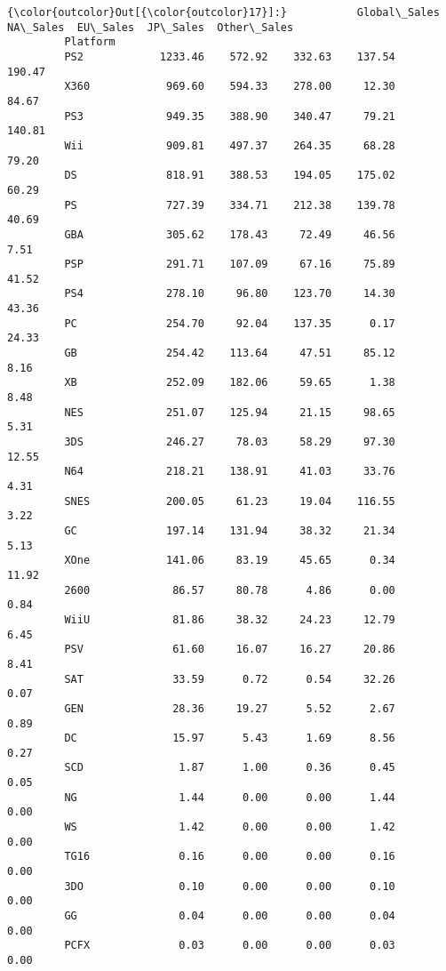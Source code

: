 \documentclass[11pt]{article}
\begin{document}
\begin{Verbatim}[commandchars=\\\{\}]
{\color{outcolor}Out[{\color{outcolor}17}]:}           Global\_Sales  NA\_Sales  EU\_Sales  JP\_Sales  Other\_Sales
         Platform                                                         
         PS2            1233.46    572.92    332.63    137.54       190.47
         X360            969.60    594.33    278.00     12.30        84.67
         PS3             949.35    388.90    340.47     79.21       140.81
         Wii             909.81    497.37    264.35     68.28        79.20
         DS              818.91    388.53    194.05    175.02        60.29
         PS              727.39    334.71    212.38    139.78        40.69
         GBA             305.62    178.43     72.49     46.56         7.51
         PSP             291.71    107.09     67.16     75.89        41.52
         PS4             278.10     96.80    123.70     14.30        43.36
         PC              254.70     92.04    137.35      0.17        24.33
         GB              254.42    113.64     47.51     85.12         8.16
         XB              252.09    182.06     59.65      1.38         8.48
         NES             251.07    125.94     21.15     98.65         5.31
         3DS             246.27     78.03     58.29     97.30        12.55
         N64             218.21    138.91     41.03     33.76         4.31
         SNES            200.05     61.23     19.04    116.55         3.22
         GC              197.14    131.94     38.32     21.34         5.13
         XOne            141.06     83.19     45.65      0.34        11.92
         2600             86.57     80.78      4.86      0.00         0.84
         WiiU             81.86     38.32     24.23     12.79         6.45
         PSV              61.60     16.07     16.27     20.86         8.41
         SAT              33.59      0.72      0.54     32.26         0.07
         GEN              28.36     19.27      5.52      2.67         0.89
         DC               15.97      5.43      1.69      8.56         0.27
         SCD               1.87      1.00      0.36      0.45         0.05
         NG                1.44      0.00      0.00      1.44         0.00
         WS                1.42      0.00      0.00      1.42         0.00
         TG16              0.16      0.00      0.00      0.16         0.00
         3DO               0.10      0.00      0.00      0.10         0.00
         GG                0.04      0.00      0.00      0.04         0.00
         PCFX              0.03      0.00      0.00      0.03         0.00
\end{Verbatim}
            
\end{document}
